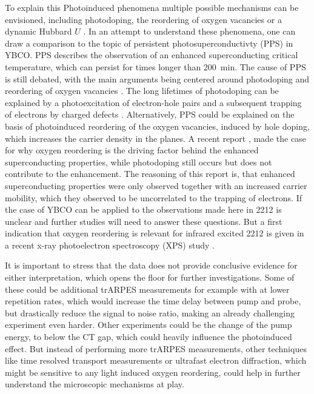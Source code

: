 To explain this Photoinduced phenomena multiple possible mechanisms can be envisioned, including photodoping, the reordering of oxygen vacancies or a dynamic Hubbard $U$ \cite{baykusheva_ultrafast_2022}.
In an attempt to understand these phenomena, one can draw a comparison to the topic of persistent photosuperconductivty (PPS) in YBCO.
PPS describes the observation of an enhanced superconducting critical temperature, which can persist for times longer than \qty{200}{\minute}.
The cause of PPS is still debated, with the main arguments being centered around photodoping and reordering of oxygen vacancies \cite{gilabert_photodoping_2000}.
The long lifetimes of photodoping can be explained by a photoexcitation of electron-hole pairs and a subsequent trapping of electrons by charged defects \cite{el_hage_disentangling_2024,kudinov_persistent_1993,kudinov_mechanisms_1994}.
Alternatively, PPS could be explained on the basis of photoinduced reordering of the oxygen vacancies, induced by hole doping, which increases the carrier density in the  planes.
A recent report \cite{el_hage_disentangling_2024}, made the case for why oxygen reordering is the driving factor behind the enhanced superconducting properties, while photodoping still occurs but does not contribute to the enhancement.
The reasoning of this report is, that enhanced superconducting properties were only observed together with an increased carrier mobility, which they observed to be uncorrelated to the trapping of electrons.
If the case of YBCO can be applied to the observations made here in 2212 is unclear and further studies will need to answer these questions.
But a first indication that oxygen reordering is relevant for infrared excited 2212 is given in a recent x-ray photoelectron spectroscopy (XPS) study \cite{puntel_out--equilibrium_2024}.

It is important to stress that the data does not provide conclusive evidence for either interpretation, which opens the floor for further investigations.
Some of these could be additional trARPES measurements for example with at lower repetition rates, which would increase the time delay between pump and probe, but drastically reduce the signal to noise ratio, making an already challenging experiment even harder.
Other experiments could be the change of the pump energy, to below the CT gap, which could heavily influence the photoinduced effect.
But instead of performing more trARPES measurements, other techniques like time resolved transport measurements or ultrafast electron diffraction, which might be sensitive to any light induced oxygen reordering, could help in further understand the microscopic mechanisms at play.

